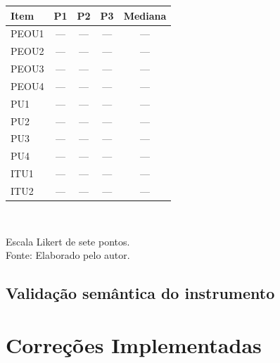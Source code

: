 \begin{quadro}[htb]
\centering
\caption{Escores do instrumento TAM --- Rodada 1}
\label{quad:res_tam_r1}
\begin{tabular}{p{2.0cm} c c c c}
\toprule
\textbf{Item} & \textbf{P1} & \textbf{P2} & \textbf{P3} & \textbf{Mediana} \\
\midrule
PEOU1 & --- & --- & --- & --- \\
PEOU2 & --- & --- & --- & --- \\
PEOU3 & --- & --- & --- & --- \\
PEOU4 & --- & --- & --- & --- \\
\midrule
PU1 & --- & --- & --- & --- \\
PU2 & --- & --- & --- & --- \\
PU3 & --- & --- & --- & --- \\
PU4 & --- & --- & --- & --- \\
\midrule
ITU1 & --- & --- & --- & --- \\
ITU2 & --- & --- & --- & --- \\
\bottomrule
\end{tabular}
\\[4pt]
\begin{flushleft}
Escala Likert de sete pontos.\\
Fonte: Elaborado pelo autor.
\end{flushleft}
\end{quadro}

\subsection{Validação semântica do instrumento}


\section{Correções Implementadas}
\label{sec:res_correcoes}


